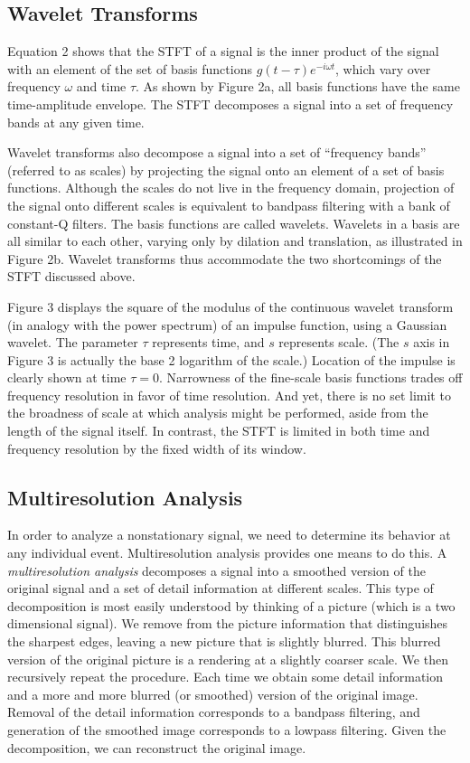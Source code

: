 \documentclass[a4paper,12pt]{article}
\begin{document}
\subsection{Wavelet Transforms}

Equation 2 shows that the STFT of a signal is the inner product of the signal with an element of the set of basis
functions \(g(t - \tau) e^{-i \omega t}\), which vary over frequency \(\omega\) and time \(\tau\). As shown by Figure 2a, all basis functions have the
same time-amplitude envelope. The STFT decomposes a signal into a set of frequency bands at any given time.

Wavelet transforms also decompose a signal into a set of ``frequency bands'' (referred to as scales) by projecting the
signal onto an element of a set of basis functions. Although the scales do not live in the frequency domain, projection
of the signal onto different scales is equivalent to bandpass filtering with a bank of constant-Q filters. The basis
functions are called wavelets. Wavelets in a basis are all similar to each other, varying only by dilation and
translation, as illustrated in Figure 2b. Wavelet transforms thus accommodate the two shortcomings of the STFT discussed
above.

Figure 3 displays the square of the modulus of the continuous wavelet transform (in analogy with the power spectrum) of an impulse function, using a Gaussian wavelet. The parameter \(\tau\) represents time, and \(s\) represents scale.
(The \(s\) axis in Figure 3 is actually the base 2 logarithm of the scale.) Location of the impulse is clearly shown at time \(\tau = 0\). Narrowness of the fine-scale basis functions trades off frequency resolution in favor of time resolution. And yet, there is no set limit to the broadness of scale at which analysis might be performed, aside from the length of the signal itself. In contrast, the STFT is limited in both time and frequency resolution by the fixed width of its window.

\subsection{Multiresolution Analysis}

In order to analyze a nonstationary signal, we need to determine its behavior at any individual event. Multiresolution
analysis provides one means to do this. A \emph{multiresolution analysis} decomposes a signal into a smoothed version of
the original signal and a set of detail information at different scales. This type of decomposition is most easily
understood by thinking of a picture (which is a two dimensional signal). We remove from the picture information that
distinguishes the sharpest edges, leaving a new picture that is slightly blurred. This blurred version of the original
picture is a rendering at a slightly coarser scale. We then recursively repeat the procedure. Each time we obtain some
detail information and a more and more blurred (or smoothed) version of the original image. Removal of the detail
information corresponds to a bandpass filtering, and generation of the smoothed image corresponds to a lowpass
filtering. Given the decomposition, we can reconstruct the original image.
\end{document}
